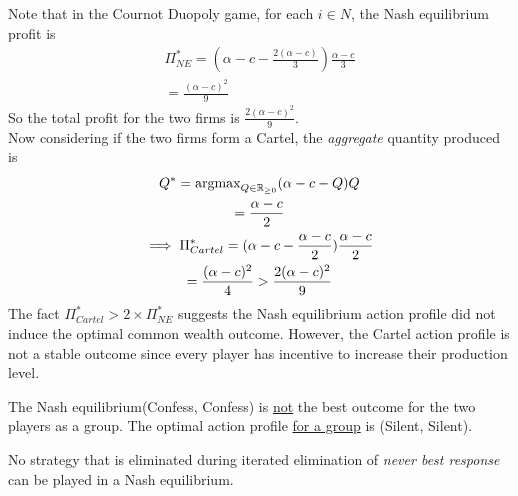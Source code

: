 \documentclass[11pt]{article}
\begin{document}
		\begin{example}
			Note that in the Cournot Duopoly game, for each $i \in N$, the Nash equilibrium profit is
			\begin{gather}
				\Pi_{NE}^* = (\alpha - c - \frac{2(\alpha - c)}{3}) \frac{\alpha - c}{3} \\
				= \frac{(\alpha - c)^2}{9}
			\end{gather}
			So the total profit for the two firms is $\frac{2(\alpha - c)^2}{9}$. \\
			Now considering if the two firms form a Cartel, the \emph{aggregate} quantity produced is
			\begin{gather}
				Q^* = \text{{argmax}}_{Q \in \mathbb{R}_{\geq 0}} (\alpha - c - Q) Q \\
				= \frac{\alpha - c}{2} \\
				\implies \Pi_{Cartel}^* = (\alpha - c - \frac{\alpha - c}{2}) \frac{\alpha - c}{2} \\
				= \frac{(\alpha - c)^2}{4} > \frac{2(\alpha - c)^2}{9}
			\end{gather}
			The fact $\Pi_{Cartel}^* > 2 \times \Pi_{NE}^*$ suggests the Nash equilibrium action profile did not induce the optimal common wealth outcome. However, the Cartel action profile is not a stable outcome since every player has incentive to increase their production level.
		\end{example}
		
		\begin{example}
			The Nash equilibrium(Confess, Confess) is \ul{not} the best outcome for the two players as a group. The optimal action profile \ul{for a group} is (Silent, Silent).
		\end{example}
		
		\begin{proposition}
			No strategy that is eliminated during iterated elimination of \emph{never best response} can be played in a Nash equilibrium.
		\end{proposition}
	
	\newpage
\end{document}
